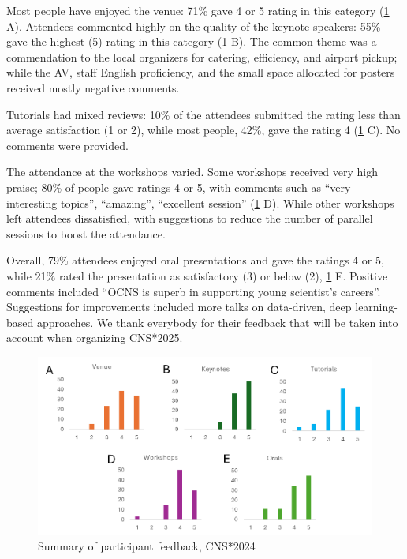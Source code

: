 \documentclass[11pt,a4paper,oneside]{article}
\begin{document}
Most people have enjoyed the venue: 71\% gave 4 or 5 rating in this category (\cref{fig:cns2024-summary} A).
Attendees commented highly on the quality of the keynote speakers: 55\% gave the highest (5) rating in this category (\cref{fig:cns2024-summary} B).
The common theme was a commendation to the local organizers for catering, efficiency, and airport pickup; while the AV, staff English proficiency, and the small space allocated for posters received mostly negative comments.

Tutorials had mixed reviews: 10\% of the attendees submitted the rating less than average satisfaction (1 or 2), while most people, 42\%, gave the rating 4 (\cref{fig:cns2024-summary} C). No comments were provided.

The attendance at the workshops varied.
Some workshops received very high praise; 80\% of people gave ratings 4 or 5, with comments such as \enquote{very interesting topics}, \enquote{amazing}, \enquote{excellent session} (\cref{fig:cns2024-summary} D).
While other workshops left attendees dissatisfied, with suggestions to reduce the number of parallel sessions to boost the attendance.

Overall, 79\% attendees enjoyed oral presentations and gave the ratings 4 or 5, while 21\% rated the presentation as satisfactory (3) or below (2), \cref{fig:cns2024-summary} E.
Positive comments included \enquote{OCNS is superb in supporting young scientist's careers}.
Suggestions for improvements included more talks on data-driven, deep learning-based approaches.
We thank everybody for their feedback that will be taken into account when organizing CNS*2025.

\begin{figure}[!h]
  \centering
  \includegraphics[width=\textwidth]{images/cns2024-feedback-form-summary}
  \caption{Summary of participant feedback, CNS*2024}%
  \label{fig:cns2024-summary}
\end{figure}
\end{document}
